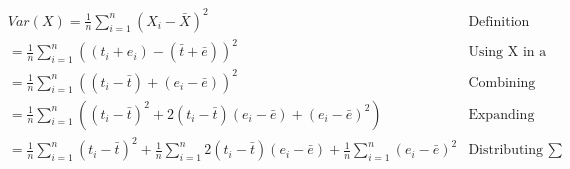 \begin{align*}
     & Var(X)  =  \frac{1}{n}\sum_{i=1}^n (X_i - \bar{X})^2                                                                                              & \mbox{Definition}                \\
     & = \frac{1}{n}\sum_{i=1}^n  ((t_i + e_i) - (\bar{t} + \bar{e}))^2                                                                                  & \mbox{Using X in a model of test theory} \\
     & = \frac{1}{n}\sum_{i=1}^n (  (t_i - \bar{t}) + (e_i - \bar{e}) )^2                                                                                & \mbox{Combining same symbols}      \\
     & = \frac{1}{n}\sum_{i=1}^n (  (t_i - \bar{t})^2 + 2(t_i - \bar{t})(e_i - \bar{e}) + (e_i - \bar{e})^2  )                                           & \mbox{Expanding}                \\
     & = \frac{1}{n}\sum_{i=1}^n (t_i - \bar{t})^2 +\frac{1}{n}\sum_{i=1}^n 2(t_i - \bar{t})(e_i - \bar{e})  + \frac{1}{n}\sum_{i=1}^n (e_i - \bar{e})^2 & \mbox{Distributing $\sum$}            \\
\end{align*}
